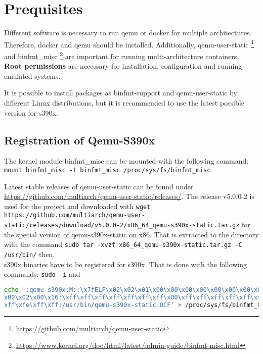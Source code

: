 \chapter{Prequisites}\label{ch:prequisites}


Different software is necessary to run qemu or docker for multiple architectures. Therefore, docker and qemu should be installed. Additionally, qemu-user-static \footnote{\url{https://github.com/multiarch/qemu-user-static}} and binfmt\_misc \footnote{\url{https://www.kernel.org/doc/html/latest/admin-guide/binfmt-misc.html}} are important for running multi-architecture containers. \\
\textbf{Root permissions} are necessary for installation, configuration and running emulated systems.

It is possible to install packages as binfmt-support and qemu-user-static by different Linux distributions, but it is recommended to use the latest possible version for s390x. \\

\section{Registration of Qemu-S390x}\label{Qemu-S390-Registration}

The kernel module binfmt\_misc can be mounted with the following command: \\
\lstinline!mount binfmt_misc -t binfmt_misc /proc/sys/fs/binfmt_misc!

Latest stable releases of qemu-user-static can be found under \url{https://github.com/multiarch/qemu-user-static/releases/}. The release v5.0.0-2 is used for the project and downloaded with \lstinline!wget https://github.com/multiarch/qemu-user-static/releases/download/v5.0.0-2/x86_64_qemu-s390x-static.tar.gz! for the special version of qemu-s390x-static on x86. That is extracted to the directory  with the command \lstinline!sudo tar -xvzf x86_64_qemu-s390x-static.tar.gz -C /usr/bin/! then. \\

s390x binaries have to be registered for s390x. That is done with the following commands: \lstinline!sudo -i! and \begin{lstlisting}[language=bash, numberstyle=\myHexNumber, caption={Register s390x binaries},captionpos=b]
echo ':qemu-s390x:M::\x7fELF\x02\x02\x01\x00\x00\x00\x00\x00\x00\x00\x00\x00\ 
x00\x02\x00\x16:\xff\xff\xff\xff\xff\xff\xff\x00\xff\xff\xff\xff\xff\xff\xff\xff\
xff\xfe\xff\xff:/usr/bin/qemu-s390x-static:OCF' > /proc/sys/fs/binfmt_misc/register
\end{lstlisting}

